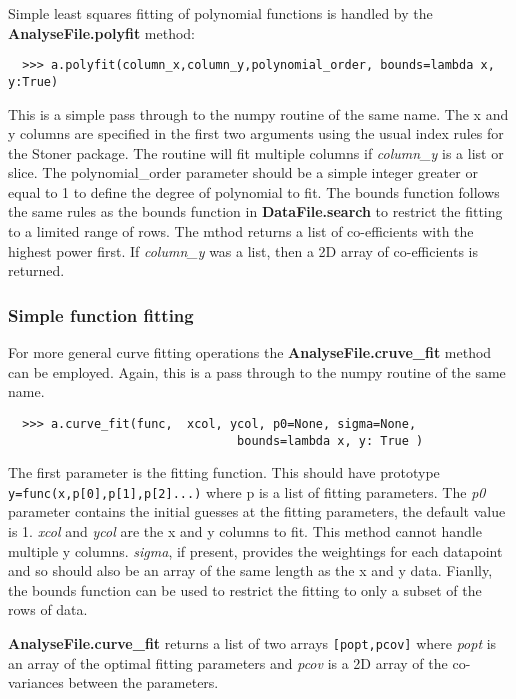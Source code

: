 \documentclass[a4paper,11pt]{scrartcl}
\begin{document}
Simple least squares fitting of polynomial functions is handled by the \textbf{AnalyseFile.polyfit} method:

\begin{verbatim}
  >>> a.polyfit(column_x,column_y,polynomial_order, bounds=lambda x, y:True)
\end{verbatim}

This is a simple pass through to the numpy routine of the same name. The x and y columns are specified in the first two arguments using the usual index rules for the Stoner package. The routine will fit multiple columns if \textit{column\_y} is a list or slice. The polynomial\_order parameter should be a simple integer greater or equal to 1 to define the degree of polynomial to fit. The bounds function follows the same rules as the bounds function in \textbf{DataFile.search} to restrict the fitting to a limited range of rows. The mthod returns a list of co-efficients with the highest power first. If \textit{column\_y} was a list, then a 2D array of co-efficients is returned. 

\subsubsection{Simple function fitting}

For more general curve fitting operations the \textbf{AnalyseFile.cruve\_fit} method can be employed. Again, this is a pass through to the numpy routine of the same name.

\begin{verbatim}
  >>> a.curve_fit(func,  xcol, ycol, p0=None, sigma=None, 
                                bounds=lambda x, y: True )
\end{verbatim}

The first parameter is the fitting function. This should have prototype \\\verb:y=func(x,p[0],p[1],p[2]...): where p is a list of fitting parameters. The \textit{p0} parameter contains the initial guesses at the fitting parameters, the default value is 1. \textit{xcol} and \textit{ycol} are the x and y columns to fit. This method cannot handle multiple y columns. \textit{sigma}, if present, provides the weightings for each datapoint and so should also be an array of the same length as the x and y data. Fianlly, the bounds function can be used to restrict the fitting to only a subset of the rows of data.

\textbf{AnalyseFile.curve\_fit} returns a list of two arrays \verb:[popt,pcov]: where \textit{popt} is an array of the optimal fitting parameters and \textit{pcov} is a 2D array of the co-variances between the parameters.
\end{document}
